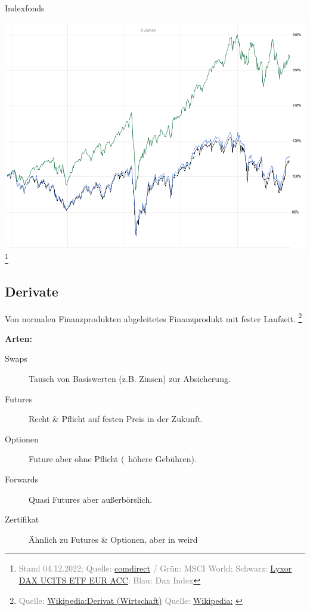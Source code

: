 \documentclass{beamer}
\let\oldfootnote\footnote
\renewcommand{\footnote}[1]
{%
	\oldfootnote
	{
		\tiny
		\textcolor{gray}{#1}
	}%
}
\newcommand{\citewiki}[2][]
{%
	\footnote
	{
		\ifthenelse{\isempty{#1}}
		{
			Quelle: \href{https://de.wikipedia.org/wiki/#2}{Wikipedia:#2}
		}
		{
			Quelle: \href{https://de.wikipedia.org/wiki/#2}{Wikipedia:#1}
		}
	}
}
\begin{document}
			\begin{frame}{Indexfonds}
				\begin{center}
					\includegraphics[height=0.75\textheight,trim=0 0 0 0.5cm]{images/dax-etf-benchmark}\footnote{Stand 04.12.2022; Quelle: \href{https://charts.comdirect.de/charts/benchmark_underlying.chart?HEIGHT=600&WIDTH=800&ID_BENCH1=20735&ID_BENCH2=12221463&ID_NOTATION=17138767&TIME_SPAN=5Y}{comdirect} / Grün: MSCI World; Schwarz: \href{https://www.comdirect.de/inf/etfs/LU0252633754}{Lyxor DAX UCITS ETF EUR ACC}; Blau: Dax Index}\\
				\end{center}
			\end{frame}
		
		\subsection{Derivate}
		
			\begin{frame}
				\begin{definition}
					Von normalen Finanzprodukten abgeleitetes Finanzprodukt mit fester Laufzeit.\citewiki{Derivat (Wirtschaft)}
				\end{definition}
				\textbf{Arten:}
				\begin{description}
					\item[Swaps] Tausch von Basiswerten (z.B. Zinsen) zur Absicherung.
					\item[Futures] Recht \& Pflicht auf festen Preis in der Zukunft.
					\item[Optionen] Future aber ohne Pflicht (\textrightarrow\ höhere Gebühren).
					\item[Forwards] Quasi Futures aber außerbörslich.
					\item[Zertifikat] Ähnlich zu Futures \& Optionen, aber in weird
				\end{description}
			\end{frame}
		
\end{document}

